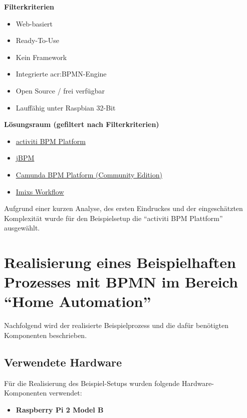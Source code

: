 \textbf{Filterkriterien}
\begin{itemize}
\item Web-basiert
\item Ready-To-Use
\item Kein Framework
\item Integrierte \gls{acr:BPMN}-Engine
\item Open Source / frei verfügbar
\item Lauffähig unter Raspbian 32-Bit
\end{itemize}

\textbf{Lösungsraum (gefiltert nach Filterkriterien)}
\begin{itemize}
\item \hyperlink{http://activiti.org/}{activiti BPM Platform}
\item \hyperlink{http://www.jbpm.org/}{jBPM}
\item \hyperlink{https://camunda.com/}{Camunda BPM Platform (Community Edition)}
\item \hyperlink{http://www.imixs.org/}{Imixs Workflow}
\end{itemize}

Aufgrund einer kurzen Analyse, des ersten Eindruckes und der eingeschätzten Komplexität wurde für den Beispielsetup die "`activiti BPM Plattform"' ausgewählt.


\newpage
\section{Realisierung eines Beispielhaften Prozesses mit BPMN im Bereich "`Home Automation"'} \label{sec:AnalyseRPI:Beispiel}
Nachfolgend wird der realisierte Beispielprozess und die dafür benötigten Komponenten beschrieben.

\subsection{Verwendete Hardware}
Für die Realisierung des Beispiel-Setups wurden folgende Hardware-Komponenten verwendet:
\begin{itemize}
\item \textbf{Raspberry Pi 2 Model B}
\end{itemize}

